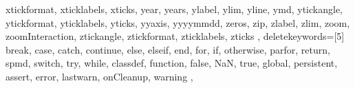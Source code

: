 {{        xtickformat,%
        xticklabels,%
        xticks,%
        year,%
        years,%
        ylabel,%
        ylim,%
        yline,%
        ymd,%
        ytickangle,%
        ytickformat,%
        yticklabels,%
        yticks,%
        yyaxis,%
        yyyymmdd,%
        zeros,%
        zip,%
        zlabel,%
        zlim,%
        zoom,%
        zoomInteraction,%
        ztickangle,%
        ztickformat,%
        zticklabels,%
        zticks%
    },
    deletekeywords=[5]{%
        break,
        case,
        catch,
        continue,
        else,
        elseif,
        end,
        for,
        if,
        otherwise,
        parfor,
        return,
        spmd,
        switch,
        try,
        while,%
        classdef,
        function,
        false,
        NaN,
        true,
        global,
        persistent,
        assert,
        error,%
        lastwarn,
        onCleanup,
        warning%
    },
}
